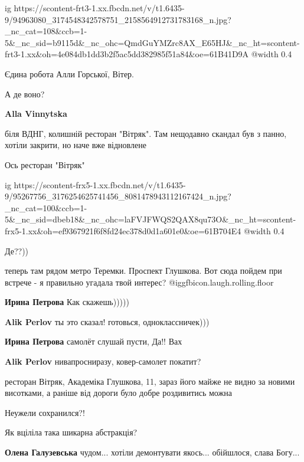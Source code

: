  
 
 
 
 

\ifcmt
  ig https://scontent-frt3-1.xx.fbcdn.net/v/t1.6435-9/94963080_3174548342578751_2158564912731783168_n.jpg?_nc_cat=108&ccb=1-5&_nc_sid=b9115d&_nc_ohc=QmdGuYMZrc8AX_E65HJ&_nc_ht=scontent-frt3-1.xx&oh=4e084db1dd3b2f5ac5dd382985f51a84&oe=61B41D9A
  @width 0.4
\fi

Єдина робота Алли Горської, Вітер.

А де воно?

\textbf{Alla Vinnytska} 

біля ВДНГ, колишній ресторан "Вітряк". Там нещодавно скандал був з панно,
хотіли закрити, но наче вже відновлене

Ось ресторан "Вітряк"

\ifcmt
  ig https://scontent-frx5-1.xx.fbcdn.net/v/t1.6435-9/95267756_3176254625741456_8081478943112167424_n.jpg?_nc_cat=100&ccb=1-5&_nc_sid=dbeb18&_nc_ohc=laFVJFWQS2QAX8qu73O&_nc_ht=scontent-frx5-1.xx&oh=ef9367921f6f8fd24ec378d0d1a601e0&oe=61B704E4
  @width 0.4
\fi

Де??))

теперь там рядом метро Теремки. Проспект Глушкова. Вот сюда пойдем при встрече - я правильно угадала твой интерес? @igg{fbicon.laugh.rolling.floor} 

\textbf{Ирина Петрова} Как скажешь)))))

\textbf{Alik Perlov} ты это сказал! готовься, одноклассничек)))

\textbf{Ирина Петрова} самолёт слушай пусти, Да!! Вах

\textbf{Alik Perlov} нивапросниразу, ковер-самолет покатит?


ресторан Вітряк, Академіка Глушкова, 11, зараз його майже не видно за новими
висотками, а раніше від дороги було добре роздивитись можна

Неужели сохранился?!

Як вціліла така шикарна абстракція?

\textbf{Олена Галузевська} чудом... хотіли демонтувати якось... обійшлося, слава Богу...

